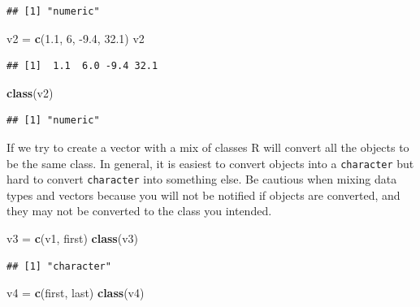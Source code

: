\documentclass[
]{book}
\newenvironment{Shaded}{\begin{snugshade}}{\end{snugshade}}
\newcommand{\DecValTok}[1]{\textcolor[rgb]{0.00,0.00,0.81}{#1}}
\newcommand{\FloatTok}[1]{\textcolor[rgb]{0.00,0.00,0.81}{#1}}
\newcommand{\KeywordTok}[1]{\textcolor[rgb]{0.13,0.29,0.53}{\textbf{#1}}}
\newcommand{\NormalTok}[1]{#1}
\newcommand{\StringTok}[1]{\textcolor[rgb]{0.31,0.60,0.02}{#1}}
\begin{document}
\begin{verbatim}
## [1] "numeric"
\end{verbatim}

\begin{Shaded}
\begin{Highlighting}[]
\NormalTok{v2 =}\StringTok{ }\KeywordTok{c}\NormalTok{(}\FloatTok{1.1}\NormalTok{, }\DecValTok{6}\NormalTok{, }\FloatTok{-9.4}\NormalTok{, }\FloatTok{32.1}\NormalTok{)}
\NormalTok{v2}
\end{Highlighting}
\end{Shaded}

\begin{verbatim}
## [1]  1.1  6.0 -9.4 32.1
\end{verbatim}

\begin{Shaded}
\begin{Highlighting}[]
\KeywordTok{class}\NormalTok{(v2)}
\end{Highlighting}
\end{Shaded}

\begin{verbatim}
## [1] "numeric"
\end{verbatim}

If we try to create a vector with a mix of classes R will convert all the objects to be the same class. In general, it is easiest to convert objects into a \texttt{character} but hard to convert \texttt{character} into something else. Be cautious when mixing data types and vectors because you will not be notified if objects are converted, and they may not be converted to the class you intended.

\begin{Shaded}
\begin{Highlighting}[]
\NormalTok{v3 =}\StringTok{ }\KeywordTok{c}\NormalTok{(v1, first)}
\KeywordTok{class}\NormalTok{(v3)}
\end{Highlighting}
\end{Shaded}

\begin{verbatim}
## [1] "character"
\end{verbatim}

\begin{Shaded}
\begin{Highlighting}[]
\NormalTok{v4 =}\StringTok{ }\KeywordTok{c}\NormalTok{(first, last)}
\KeywordTok{class}\NormalTok{(v4)}
\end{Highlighting}
\end{Shaded}
\end{document}
